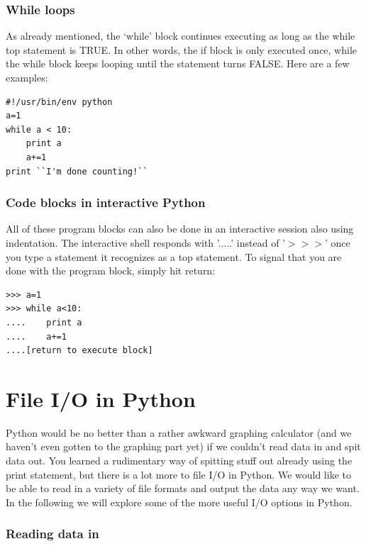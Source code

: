 \documentclass[11pt]{book}
\begin{document}
{{\subsubsection{While loops}

As already mentioned, the `while' block  continues executing as long as the {\color{blue}while}  top statement is TRUE.  In other words, the if block is only executed once, while the {\color{blue}while}  block keeps looping until the statement turns FALSE.    Here are a few examples:


{ \color{blue} \begin{verbatim}
#!/usr/bin/env python
a=1
while a < 10:
    print a
    a+=1
print ``I'm done counting!``
\end{verbatim}}

\subsubsection{Code blocks in interactive Python}

All of these program blocks can also be done in an interactive session also using indentation.  The interactive shell responds with '.....'  instead of '$>>>$' once you type a statement it recognizes as a top statement.   To signal that you are done with the program block, simply hit return:


{ \color{blue} \begin{verbatim}
>>> a=1
>>> while a<10:
....    print a
....    a+=1
....[return to execute block]
\end{verbatim}}



\section{File I/O in Python}

Python would be no better than a rather awkward graphing calculator (and we haven't even gotten to the graphing part yet) if we couldn't read data in and spit data out.   You learned a rudimentary way of spitting stuff out already using the {\color{blue}print} statement, but there is a lot more to file I/O in Python.  We would like to be able to read in a variety of file formats  and output the data any way we want.  In the following we will explore some of the more useful  I/O options in Python.




\subsubsection{Reading data in}
}}
\end{document}
